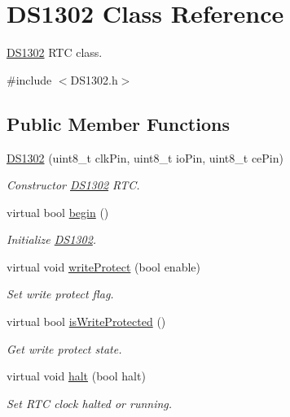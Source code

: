 \hypertarget{class_d_s1302}{}\section{D\+S1302 Class Reference}
\label{class_d_s1302}


\hyperlink{class_d_s1302}{D\+S1302} R\+TC class.  




{\ttfamily \#include $<$D\+S1302.\+h$>$}

\subsection*{Public Member Functions}
\begin{DoxyCompactItemize}
\item 
\hyperlink{class_d_s1302_ae7f11fc2a6a8333df47be5f8996729e7}{D\+S1302} (uint8\+\_\+t clk\+Pin, uint8\+\_\+t io\+Pin, uint8\+\_\+t ce\+Pin)
\begin{DoxyCompactList}\small\item\em Constructor \hyperlink{class_d_s1302}{D\+S1302} R\+TC. \end{DoxyCompactList}\item 
virtual bool \hyperlink{class_d_s1302_a2a224cc4638a850a7ef7af6385d22817}{begin} ()
\begin{DoxyCompactList}\small\item\em Initialize \hyperlink{class_d_s1302}{D\+S1302}. \end{DoxyCompactList}\item 
virtual void \hyperlink{class_d_s1302_abb5fdad141ff792fa2d0edb308b83903}{write\+Protect} (bool enable)
\begin{DoxyCompactList}\small\item\em Set write protect flag. \end{DoxyCompactList}\item 
virtual bool \hyperlink{class_d_s1302_a72edd217b42eb23576e6d63c8a560f17}{is\+Write\+Protected} ()
\begin{DoxyCompactList}\small\item\em Get write protect state. \end{DoxyCompactList}\item 
virtual void \hyperlink{class_d_s1302_a7d397e8c06e3f11c0b975c4157a14bdf}{halt} (bool halt)
\begin{DoxyCompactList}\small\item\em Set R\+TC clock halted or running. \end{DoxyCompactList}\item 

\end{DoxyCompactItemize}
